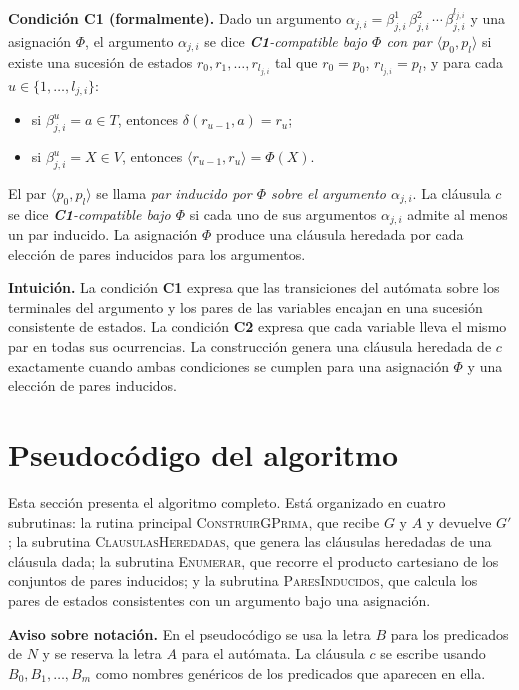 \documentclass[11pt, letterpaper]{article}
\theoremstyle{definition}
\newcommand{\trans}{\delta}
\begin{document}
\textbf{Condición \textbf{C1} (formalmente).} Dado un argumento $\alpha_{j,i} = \beta_{j,i}^{1} \, \beta_{j,i}^{2} \, \cdots \, \beta_{j,i}^{l_{j,i}}$ y una asignación $\Phi$, el argumento $\alpha_{j,i}$ se dice \emph{\textbf{C1}-compatible bajo $\Phi$ con par $\langle p_0, p_l \rangle$} si existe una sucesión de estados $r_0, r_1, \dots, r_{l_{j,i}}$ tal que $r_0 = p_0$, $r_{l_{j,i}} = p_l$, y para cada $u \in \{1, \dots, l_{j,i}\}$:

\begin{itemize}
\item si $\beta_{j,i}^{u} = a \in T$, entonces $\trans(r_{u-1}, a) = r_u$;
\item si $\beta_{j,i}^{u} = X \in V$, entonces $\langle r_{u-1}, r_u \rangle = \Phi(X)$.
\end{itemize}

El par $\langle p_0, p_l \rangle$ se llama \emph{par inducido por $\Phi$ sobre el argumento $\alpha_{j,i}$}. La cláusula $c$ se dice \emph{\textbf{C1}-compatible bajo $\Phi$} si cada uno de sus argumentos $\alpha_{j,i}$ admite al menos un par inducido. La asignación $\Phi$ produce una cláusula heredada por cada elección de pares inducidos para los argumentos.

\textbf{Intuición.} La condición \textbf{C1} expresa que las transiciones del autómata sobre los terminales del argumento y los pares de las variables encajan en una sucesión consistente de estados. La condición \textbf{C2} expresa que cada variable lleva el mismo par en todas sus ocurrencias. La construcción genera una cláusula heredada de $c$ exactamente cuando ambas condiciones se cumplen para una asignación $\Phi$ y una elección de pares inducidos.

\section{Pseudocódigo del algoritmo}

Esta sección presenta el algoritmo completo. Está organizado en cuatro subrutinas: la rutina principal \textsc{ConstruirGPrima}, que recibe $G$ y $A$ y devuelve $G'$; la subrutina \textsc{ClausulasHeredadas}, que genera las cláusulas heredadas de una cláusula dada; la subrutina \textsc{Enumerar}, que recorre el producto cartesiano de los conjuntos de pares inducidos; y la subrutina \textsc{ParesInducidos}, que calcula los pares de estados consistentes con un argumento bajo una asignación.

\textbf{Aviso sobre notación.} En el pseudocódigo se usa la letra $B$ para los predicados de $N$ y se reserva la letra $A$ para el autómata. La cláusula $c$ se escribe usando $B_0, B_1, \dots, B_m$ como nombres genéricos de los predicados que aparecen en ella.
\end{document}

